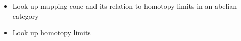 
\begin{itemize}
    \item Look up mapping cone and its relation to homotopy limits in an abelian category
    \item Look up homotopy limits
\end{itemize}